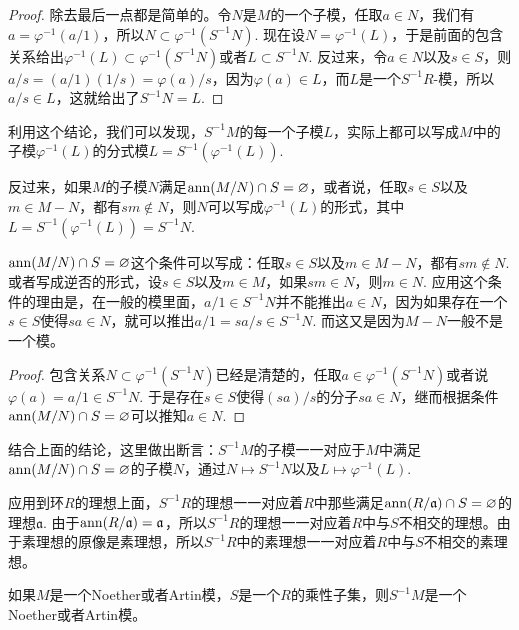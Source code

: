 \begin{proof}
	除去最后一点都是简单的。令$N$是$M$的一个子模，任取$a\in N$，我们有$a=\varphi^{-1}(a/1)$，所以$N\subset \varphi^{-1}(S^{-1}N)$. 现在设$N=\varphi^{-1}(L)$，于是前面的包含关系给出$\varphi^{-1}(L)\subset \varphi^{-1}(S^{-1}N)$或者$L\subset S^{-1}N$. 反过来，令$a\in N$以及$s\in S$，则$a/s=(a/1)(1/s)=\varphi(a)/s$，因为$\varphi(a)\in L$，而$L$是一个$S^{-1}R$-模，所以$a/s\in L$，这就给出了$S^{-1}N=L$.
\end{proof}

利用这个结论，我们可以发现，$S^{-1}M$的每一个子模$L$，实际上都可以写成$M$中的子模$\varphi^{-1}(L)$的分式模$L=S^{-1}(\varphi^{-1}(L))$. 

\para 反过来，如果$M$的子模$N$满足$\operatorname{ann}(M/N)\cap S=\varnothing$，或者说，任取$s\in S$以及$m\in M-N$，都有$sm\not\in N$，则$N$可以写成$\varphi^{-1}(L)$的形式，其中$L=S^{-1}(\varphi^{-1}(L))=S^{-1}N$. 

$\operatorname{ann}(M/N)\cap S=\varnothing$这个条件可以写成：任取$s\in S$以及$m\in M-N$，都有$sm\not\in N$. 或者写成逆否的形式，设$s\in S$以及$m\in M$，如果$sm\in N$，则$m\in N$. 应用这个条件的理由是，在一般的模里面，$a/1\in S^{-1}N$并不能推出$a\in N$，因为如果存在一个$s\in S$使得$sa\in N$，就可以推出$a/1=sa/s\in S^{-1}N$. 而这又是因为$M-N$一般不是一个模。

\begin{proof}
	包含关系$N\subset \varphi^{-1}(S^{-1}N)$已经是清楚的，任取$a\in \varphi^{-1}(S^{-1}N)$或者说$\varphi(a)=a/1\in S^{-1}N$. 于是存在$s\in S$使得$(sa)/s$的分子$sa\in N$，继而根据条件$\operatorname{ann}(M/N)\cap S=\varnothing$可以推知$a\in N$. 
\end{proof}

\begin{pro}
结合上面的结论，这里做出断言：$S^{-1}M$的子模一一对应于$M$中满足$\operatorname{ann}(M/N)\cap S=\varnothing$的子模$N$，通过$N\mapsto S^{-1}N$以及$L\mapsto \varphi^{-1}(L)$.
\end{pro}

应用到环$R$的理想上面，$S^{-1}R$的理想一一对应着$R$中那些满足$\operatorname{ann}(R/\mathfrak{a})\cap S=\varnothing$的理想$\mathfrak{a}$. 由于$\operatorname{ann}(R/\mathfrak{a})=\mathfrak{a}$，所以$S^{-1}R$的理想一一对应着$R$中与$S$不相交的理想。由于素理想的原像是素理想，所以$S^{-1}R$中的素理想一一对应着$R$中与$S$不相交的素理想。

\begin{pro}
如果$M$是一个Noether或者Artin模，$S$是一个$R$的乘性子集，则$S^{-1}M$是一个Noether或者Artin模。
\end{pro}

